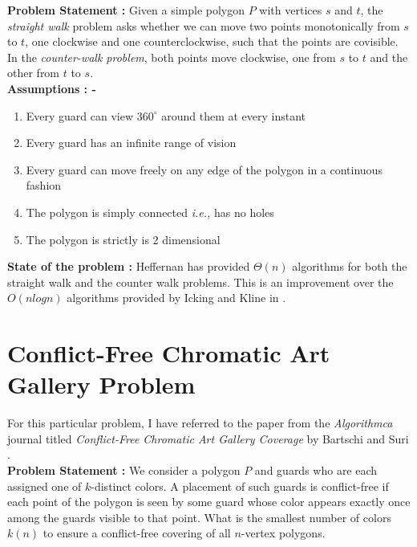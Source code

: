 \documentclass{article}
\begin{document}
\noindent \textbf{Problem Statement :} Given a simple polygon $P$ with vertices $s$ and $t$, the \textit{straight walk} problem asks whether we can move two points monotonically from $s$ to $t$, one clockwise and one counterclockwise, such that the points are covisible. In the \textit{counter-walk problem}, both points move clockwise, one from $s$ to $t$ and the other from $t$ to $s$. \\ 

\noindent \textbf{Assumptions : -}

\begin{enumerate}

	\item Every guard can view $360 ^ \circ$ around them at every instant
	
	\item Every guard has an infinite range of vision
	
	 \item Every guard can move freely on any edge of the polygon in a continuous fashion
	
	\item The polygon is simply connected \textit{i.e.,} has no holes
	
	\item The polygon is strictly is 2 dimensional
	
\end{enumerate}

\noindent \textbf{State of the problem :} Heffernan has provided $\Theta(n)$ algorithms for both the straight walk and the counter walk problems. This is an improvement over the $O(nlogn)$ algorithms provided by Icking and Kline in \cite{icking1992two}.


\section{Conflict-Free Chromatic Art Gallery Problem}

For this particular problem, I have referred to the paper from the \textit{Algorithmca} journal titled \textit{Conflict-Free Chromatic Art Gallery Coverage} by Bartschi and Suri \cite{bartschi2014conflict}. \\

\noindent \textbf{Problem Statement :} We consider a polygon $P$ and guards who are each assigned one of $k$-distinct colors. A placement of such guards is conflict-free if each point of the polygon is seen by some guard whose color appears exactly once among the guards visible to that point. What is the smallest number of colors $k(n)$ to ensure a conflict-free covering of all $n$-vertex polygons. \\ 
\end{document}
